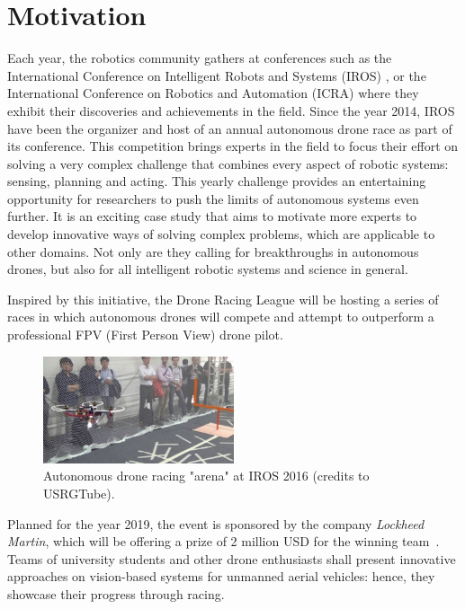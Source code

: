 \section{Motivation}

Each year, the robotics community gathers at conferences such as the
International Conference on Intelligent Robots and Systems (IROS) , or the
International Conference on Robotics and Automation (ICRA) where they exhibit
their discoveries and achievements in the field. Since the year 2014, IROS have
been the organizer and host of an annual autonomous drone race as part of its
conference. This competition brings experts in the field to focus their effort
on solving a very complex challenge that combines every aspect of robotic
systems: sensing, planning and acting. This yearly challenge provides an
entertaining opportunity for researchers to push the limits of autonomous
systems even further. It is an exciting case study that aims to motivate more
experts to develop innovative ways of solving complex problems, which are
applicable to other domains. Not only are they calling for breakthroughs in
autonomous drones, but also for all intelligent robotic systems and science in
general.

Inspired by this initiative, the Drone Racing League will be hosting a series
of races in which autonomous drones will compete and attempt to outperform a
professional FPV (First Person View) drone pilot.\\

\begin{figure}[h]
	\centering
	\includegraphics[width=0.5\textwidth]{figure/iros_2016.jpg}
	\caption{Autonomous drone racing "arena" at IROS 2016 (credits to
	USRGTube).}
	\label{fig:iros}
\end{figure}

Planned for the year 2019, the event is sponsored by the company \emph{Lockheed
Martin}, which will be offering a prize of 2 million USD for the winning
team~\cite{LockheedDRL}. Teams of university students and other drone
enthusiasts shall present innovative approaches on vision-based systems for
unmanned aerial vehicles: hence, they showcase their progress through racing.

